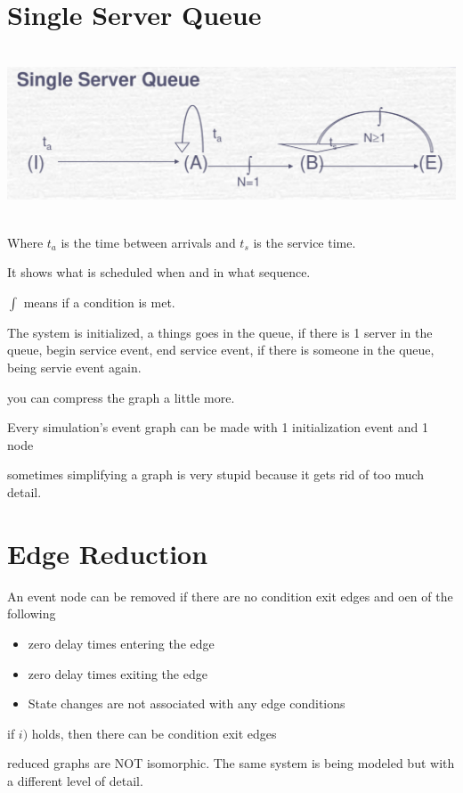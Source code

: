 \documentclass[fleqn]{report}
\begin{document}
\section{Single Server Queue}
\includegraphics[width = 16cm, height = 5cm]{CS482.1.png}

Where $t_a$ is the time between arrivals and $t_s$ is the service time. 

It shows what is scheduled when and in what sequence. 

$\int$ means if a condition is met. 

The system is initialized, a things goes in the queue, if 
there is 1 server in the queue, begin service event, end service event, 
if there is someone in the queue, being servie event again. 

you can compress the graph a little more.

Every simulation's event graph can be made with 
1 initialization event and 1 node

sometimes simplifying a graph is very stupid because it gets rid of 
too much detail. 

\section{Edge Reduction}
An event node can be removed if there are no condition exit edges and oen of the 
following 
\begin{itemize}
    \item 
    zero delay times entering the edge
    \item 
    zero delay times exiting the edge
    \item 
    State changes are not associated with any edge conditions 
\end{itemize}

if $i)$ holds, then there can be condition exit edges 

reduced graphs are NOT isomorphic. The same system is being modeled but with a 
different level of detail.
\end{document}
